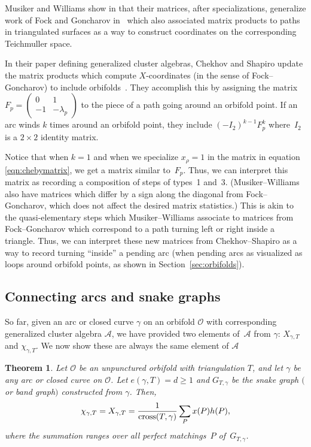 \documentclass[pdftex]{sigma}%
\numberwithin{equation}{section}
\newtheorem{Theorem}{Theorem}[section]
\begin{document}
\begin{Remark}Musiker and Williams show in \cite[Section~4]{MW} that their matrices, after specializations, generalize work of Fock and Goncharov in~\cite{FG3} which also associated matrix products to paths in triangulated surfaces as a way to construct coordinates on the corresponding Teichmuller space.

In their paper defining generalized cluster algebras, Chekhov and Shapiro update the matrix products which compute $X$-coordinates (in the sense of Fock--Goncharov) to include orbifolds~\cite{Chekhov-Shapiro}.
They accomplish this by assigning the matrix $F_p = \left(\begin{smallmatrix} 0 & 1 \\ -1 & -\lambda_p \end{smallmatrix}\right)$ to the piece of a path going around an orbifold point. If an arc winds $k$ times around an orbifold point, they include $(-I_2)^{k-1}F_p^k$ where~$I_2$ is a $2 \times 2$ identity matrix.

Notice that when $k = 1$ and when we specialize $x_\rho = 1$ in the matrix in equation \eqref{eqn:chebymatrix}, we get a matrix similar to~$F_p$. Thus, we can interpret this matrix as recording a composition of steps of types~1 and~3. (Musiker--Williams also have matrices which differ by a sign along the diagonal from Fock--Goncharov, which does not affect the desired matrix statistics.) This is akin to the quasi-elementary steps which Musiker--Williams associate to matrices from Fock--Goncharov which correspond to a path turning left or right inside a triangle. Thus, we can interpret these new matrices from Chekhov--Shapiro as a way to record turning ``inside'' a pending arc (when pending arcs as visualized as loops around orbifold points, as shown in Section~\ref{sec:orbifolds}).
\end{Remark}

\subsection{Connecting arcs and snake graphs}

So far, given an arc or closed curve $\gamma$ on an orbifold $\mathcal{O}$ with corresponding generalized cluster algebra $\mathcal{A}$, we have provided two elements of~$\mathcal{A}$ from $\gamma$: $X_{\gamma,T}$ and $\chi_{\gamma,T}$. We now show these are always the same element of $\mathcal{A}$

\begin{Theorem}\label{Thm:ArcsAndGraphs}
Let $\mathcal{O}$ be an unpunctured orbifold with triangulation $T$, and let $\gamma$ be any arc or closed curve on $\mathcal{O}$. Let $e(\gamma, T) = d \geq 1$ and $G_{T,\gamma}$ be the snake graph $($or band graph$)$ constructed from $\gamma$. Then,
\begin{equation}\label{MandGraphEqn}
\chi_{\gamma,T} = X_{\gamma,T} = \frac{1}{{\rm cross}(T,\gamma)} \sum_P x(P) h(P),
\end{equation}
where the summation ranges over all perfect matchings~$P$ of~$G_{T,\gamma}$.
\end{Theorem}
\end{document}
